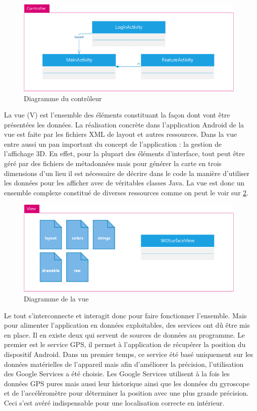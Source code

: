         \begin{figure}[H]
            \centering
            \includegraphics{./img/android-controller.png}
            \caption{Diagramme du contrôleur}
            \label{controller}
        \end{figure}


        La vue (V) est l’ensemble des éléments constituant la façon dont vont être présentées les données. La réalisation concrète dans l’application Android de la vue est faite par les fichiers XML de layout et autres ressources. Dans la vue entre aussi un pan important du concept de l’application : la gestion de l’affichage 3D. En effet, pour la plupart des éléments d’interface, tout peut être géré par des fichiers de métadonnées mais pour générer la carte en trois dimensions d’un lieu il est nécessaire de décrire dans le code la manière d’utiliser les données pour les afficher avec de véritables classes Java. La vue est donc un ensemble complexe constitué de diverses ressources comme on peut le voir sur \ref{view}.

        \begin{figure}[H]
            \centering
            \includegraphics{./img/android-view.png}
            \caption{Diagramme de la vue}
            \label{view}
        \end{figure}

        Le tout s’interconnecte et interagit donc pour faire fonctionner l’ensemble. Mais pour alimenter l’application en données exploitables, des services ont dû être mis en place. Il en existe deux qui servent de sources de données au programme. Le premier est le service GPS, il permet à l’application de récupérer la position du dispositif Android. Dans un premier temps, ce service été basé uniquement sur les données matérielles de l’appareil mais afin d’améliorer la précision, l’utilisation des Google Services a été choisie. Les Google Services utilisent à la fois les données GPS pures mais aussi leur historique ainsi que les données du gyroscope et de l’accéléromètre pour déterminer la position avec une plus grande précision. Ceci s’est avéré indispensable pour une localisation correcte en intérieur.

